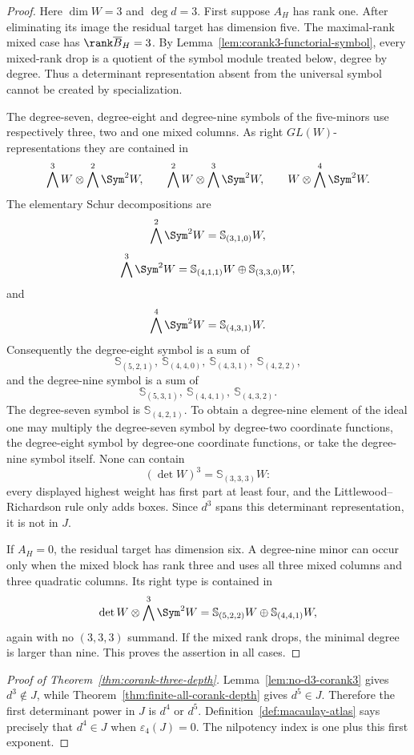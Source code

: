 \begin{proof}
Here \(\dim W=3\) and \(\deg d=3\).  First suppose
\(A_H\) has rank one.  After eliminating its image the residual target
has dimension five.  The maximal-rank mixed case has
\(\rank\overline B_H=3\).  By
Lemma~\ref{lem:corank3-functorial-symbol}, every mixed-rank drop is a
quotient of the symbol module treated below, degree by degree.  Thus a
determinant representation absent from the universal symbol cannot be
created by specialization.

The degree-seven, degree-eight and degree-nine symbols of the
five-minors use respectively three, two and one mixed columns.  As
right \(GL(W)\)-representations they are contained in
\[
 \bigwedge^3W\otimes\bigwedge^2\Sym^2W,\qquad
 \bigwedge^2W\otimes\bigwedge^3\Sym^2W,\qquad
 W\otimes\bigwedge^4\Sym^2W.
\]
The elementary Schur decompositions are
\[
 \bigwedge^2\Sym^2W=\mathbb S_{(3,1,0)}W,
\]
\[
 \bigwedge^3\Sym^2W=
 \mathbb S_{(4,1,1)}W\oplus
 \mathbb S_{(3,3,0)}W,
\]
and
\[
 \bigwedge^4\Sym^2W=\mathbb S_{(4,3,1)}W.
\]
Consequently the degree-eight symbol is a sum of
\[
 \mathbb S_{(5,2,1)},\
 \mathbb S_{(4,4,0)},\
 \mathbb S_{(4,3,1)},\
 \mathbb S_{(4,2,2)},
\]
and the degree-nine symbol is a sum of
\[
 \mathbb S_{(5,3,1)},\
 \mathbb S_{(4,4,1)},\
 \mathbb S_{(4,3,2)}.
\]
The degree-seven symbol is
\(\mathbb S_{(4,2,1)}\).
To obtain a degree-nine element of the ideal one may multiply the
degree-seven symbol by degree-two coordinate functions, the
degree-eight symbol by degree-one coordinate functions, or take the
degree-nine symbol itself.  None can contain
\[
 (\det W)^3=\mathbb S_{(3,3,3)}W:
\]
every displayed highest weight has first part at least four, and the
Littlewood--Richardson rule only adds boxes.  Since \(d^3\) spans
this determinant representation, it is not in \(J\).

If \(A_H=0\), the residual target has dimension six.  A degree-nine
minor can occur only when the mixed block has rank three and uses all
three mixed columns and three quadratic columns.  Its right type is
contained in
\[
 \det W\otimes\bigwedge^3\Sym^2W
 =
 \mathbb S_{(5,2,2)}W
 \oplus
 \mathbb S_{(4,4,1)}W,
\]
again with no \((3,3,3)\) summand.  If the mixed rank drops, the
minimal degree is larger than nine.  This proves the assertion in all
cases.
\end{proof}

\begin{proof}[Proof of Theorem~\ref{thm:corank-three-depth}]
Lemma~\ref{lem:no-d3-corank3} gives \(d^3\notin J\), while
Theorem~\ref{thm:finite-all-corank-depth} gives \(d^5\in J\).
Therefore the first determinant power in \(J\) is \(d^4\) or \(d^5\).
Definition~\ref{def:macaulay-atlas} says precisely that
\(d^4\in J\) when \(\varepsilon_4(J)=0\).  The nilpotency index is
one plus this first exponent.
\end{proof}

